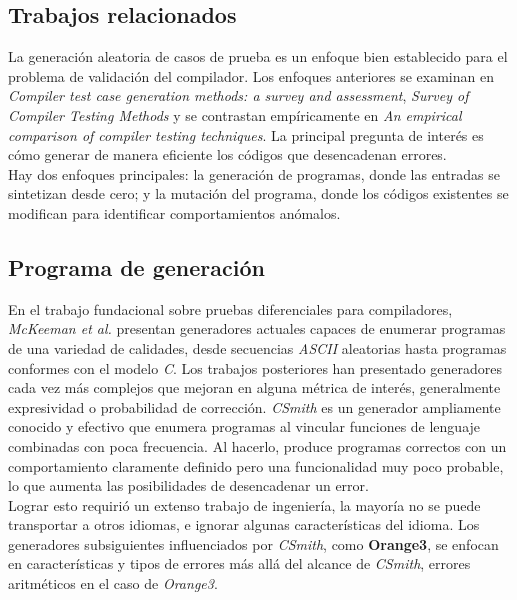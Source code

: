 \subsection{Trabajos relacionados}
La generación aleatoria de casos de prueba es un enfoque bien establecido para el problema de validación del compilador. Los enfoques anteriores se examinan en \textit{Compiler test case generation methods: a survey and assessment}\cite{Boujarwah1997CompilerTC}, \textit{Survey of Compiler Testing Methods}\cite{Kossatchev2005CompilerTM} y se contrastan empíricamente en \textit{An empirical comparison of compiler testing techniques}\cite{ComparisonCompilerTechniques}. La principal pregunta de interés es cómo generar de manera eficiente los códigos que desencadenan errores.\\

Hay dos enfoques principales: la generación de programas, donde las entradas se sintetizan desde cero; y la mutación del programa, donde los códigos existentes se modifican para identificar comportamientos anómalos.

\subsection{Programa de generación}
En el trabajo fundacional sobre pruebas diferenciales para compiladores,\textit{ McKeeman et al.} presentan generadores actuales capaces de enumerar programas de una variedad de calidades, desde secuencias \textit{ASCII} aleatorias hasta programas conformes con el modelo \textit{C}\cite{McKeeman98differentialtesting}. Los trabajos posteriores han presentado generadores cada vez más complejos que mejoran en alguna métrica de interés, generalmente expresividad o probabilidad de corrección. \textit{CSmith}\cite{Yang:2011:FUB:1993316.1993532} es un generador ampliamente conocido y efectivo que enumera programas al vincular funciones de lenguaje combinadas con poca frecuencia. Al hacerlo, produce programas correctos con un comportamiento claramente definido pero una funcionalidad muy poco probable, lo que aumenta las posibilidades de desencadenar un error.\\

Lograr esto requirió un extenso trabajo de ingeniería, la mayoría no se puede transportar a otros idiomas, e ignorar algunas características del idioma. Los generadores subsiguientes influenciados por \textit{CSmith}, como \textbf{Orange3}\cite{Nagai:Hashimoto:Ishiura}, se enfocan en características y tipos de errores más allá del alcance de \textit{CSmith}, errores aritméticos en el caso de \textit{Orange3}.\\

